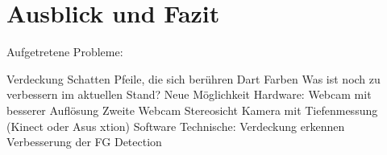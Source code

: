 \chapter{Ausblick und Fazit}
\label{chap:prospect}
Aufgetretene Probleme:

Verdeckung
Schatten
Pfeile, die sich berühren
Dart Farben
Was ist noch zu verbessern im aktuellen Stand?
Neue Möglichkeit Hardware:
Webcam mit besserer Auflösung
Zweite Webcam Stereosicht
Kamera mit Tiefenmessung (Kinect oder Asus xtion) 
Software Technische:
Verdeckung erkennen
Verbesserung der FG Detection




